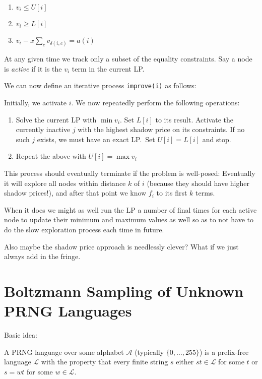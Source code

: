\begin{enumerate}
\item \(v_i \leq U[i]\)
\item \(v_i \geq L[i]\)
\item \(v_i - x \sum\limits_c v_{\delta(i, c)} = a(i)\)
\end{enumerate}

At any given time we track only a subset of the equality constraints.
Say a node is \emph{active} if it is the \(v_i\) term in the current LP.\ 

We can now define an iterative process \texttt{improve(i)} as follows:

Initially, we activate \(i\).
We now repeatedly perform the following operations:

\begin{enumerate}
\item Solve the current LP with \(\min v_i\).
Set \(L[i]\) to its result.
Activate the currently inactive \(j\) with the highest shadow price on its constraints.
If no such \(j\) exists,
we must have an exact LP.\ 
Set \(U[i] = L[i]\) and stop.
\item Repeat the above with \(U[i] = \max v_i\)
\end{enumerate}

This process should eventually terminate if the problem is well-posed:
Eventually it will explore all nodes within distance \(k\) of \(i\) (because they should have higher shadow prices!),
and after that point we know \(f_i\) to its first \(k\) terms.

When it does we might as well run the LP a number of final times for each active node to update their minimum and maximum values as well so as to not have to do the slow exploration process each time in future.

Also maybe the shadow price approach is needlessly clever?
What if we just always add in the fringe.

\section{Boltzmann Sampling of Unknown PRNG Languages}

Basic idea:

\begin{definition}
A PRNG language over some alphabet \(\mathcal{A}\) (typically \(\{0, \ldots, 255\}\)) is a prefix-free language \(\mathcal{L}\) with the property that every finite string \(s\) either \(st \in \mathcal{L}\) for some \(t\) or \(s = wt\) for some \(w \in \mathcal{L}\).
\end{definition}


